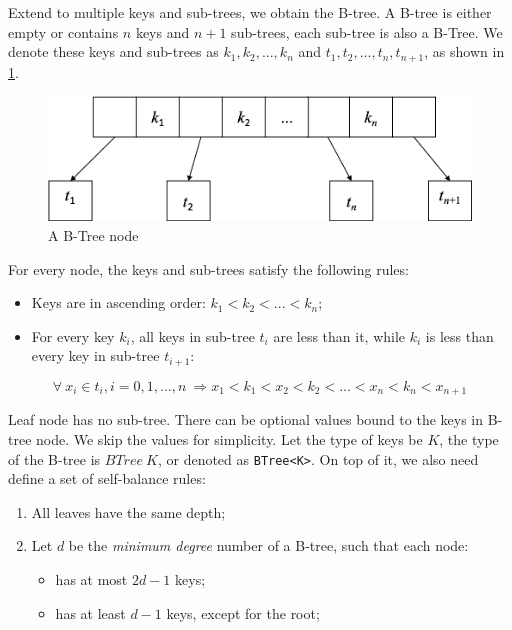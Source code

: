 \documentclass[b5paper]{article}
\begin{document}
Extend to multiple keys and sub-trees, we obtain the B-tree. A B-tree is either empty or contains $n$ keys and $n + 1$ sub-trees, each sub-tree is also a B-Tree. We denote these keys and sub-trees as $k_1, k_2, ..., k_n$ and $t_1, t_2, ..., t_n, t_{n+1}$, as shown in \cref{fig:btree-node}.

\begin{figure}[htbp]
  \centering
  \includegraphics[scale=0.5]{img/btree-node}
  \caption{A B-Tree node}
  \label{fig:btree-node}
\end{figure}

For every node, the keys and sub-trees satisfy the following rules:

\begin{itemize}
\item Keys are in ascending order: $k_1 < k_2 < ... < k_n$;
\item For every key $k_i$, all keys in sub-tree $t_i$ are less than it, while $k_i$ is less than every key in sub-tree $t_{i+1}$:
\end{itemize}

\begin{equation}
\forall\ x_i \in t_i, i=0, 1, ..., n\ \Rightarrow x_1 < k_1 < x_2 < k_2 < ... < x_n < k_n < x_{n+1}
\label{eq:btree-order}
\end{equation}

Leaf node has no sub-tree. There can be optional values bound to the keys in B-tree node. We skip the values for simplicity. Let the type of keys be $K$, the type of the B-tree is $BTree\ K$, or denoted as \texttt{BTree<K>}. On top of it, we also need define a set of self-balance rules:

\begin{enumerate}
\item All leaves have the same depth;
\item Let $d$ be the {\em minimum degree} number of a B-tree, such that each node:
  \begin{itemize}
  \item has at most $2d - 1$ keys;
  \item has at least $d - 1$ keys, except for the root;
  \end{itemize}
\end{enumerate}
\end{document}
